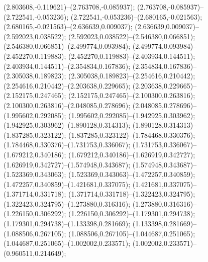  (2.803608,-0.119621)--(2.763708,-0.085937);
 (2.763708,-0.085937)--(2.722541,-0.053236);
 (2.722541,-0.053236)--(2.680165,-0.021563);
 (2.680165,-0.021563)--(2.636639,0.009037);
 (2.636639,0.009037)--(2.592023,0.038522);
 (2.592023,0.038522)--(2.546380,0.066851);
 (2.546380,0.066851)--(2.499774,0.093984);
 (2.499774,0.093984)--(2.452270,0.119883);
 (2.452270,0.119883)--(2.403934,0.144511);
 (2.403934,0.144511)--(2.354834,0.167836);
 (2.354834,0.167836)--(2.305038,0.189823);
 (2.305038,0.189823)--(2.254616,0.210442);
 (2.254616,0.210442)--(2.203638,0.229665);
 (2.203638,0.229665)--(2.152175,0.247465);
 (2.152175,0.247465)--(2.100300,0.263816);
 (2.100300,0.263816)--(2.048085,0.278696);
 (2.048085,0.278696)--(1.995602,0.292085);
 (1.995602,0.292085)--(1.942925,0.303962);
 (1.942925,0.303962)--(1.890128,0.314313);
 (1.890128,0.314313)--(1.837285,0.323122);
 (1.837285,0.323122)--(1.784468,0.330376);
 (1.784468,0.330376)--(1.731753,0.336067);
 (1.731753,0.336067)--(1.679212,0.340186);
 (1.679212,0.340186)--(1.626919,0.342727);
 (1.626919,0.342727)--(1.574948,0.343687);
 (1.574948,0.343687)--(1.523369,0.343063);
 (1.523369,0.343063)--(1.472257,0.340859);
 (1.472257,0.340859)--(1.421681,0.337075);
 (1.421681,0.337075)--(1.371714,0.331718);
 (1.371714,0.331718)--(1.322423,0.324795);
 (1.322423,0.324795)--(1.273880,0.316316);
 (1.273880,0.316316)--(1.226150,0.306292);
 (1.226150,0.306292)--(1.179301,0.294738);
 (1.179301,0.294738)--(1.133398,0.281669);
 (1.133398,0.281669)--(1.088506,0.267105);
 (1.088506,0.267105)--(1.044687,0.251065);
 (1.044687,0.251065)--(1.002002,0.233571);
 (1.002002,0.233571)--(0.960511,0.214649);
